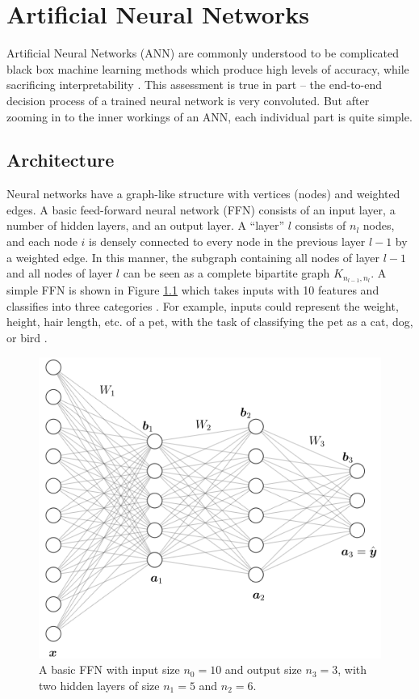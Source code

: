 
\appendix \label{apdx}



\chapter{Artificial Neural Networks} \label{apdx:ann}
Artificial Neural Networks (ANN) are commonly understood to be complicated black box machine learning methods which produce high levels of accuracy, while sacrificing interpretability \cite{pattern_rec_book}. This assessment is true in part -- the end-to-end decision process of a trained neural network is very convoluted. But after zooming in to the inner workings of an ANN, each individual part is quite simple.

\section{Architecture}
Neural networks have a graph-like structure with vertices (nodes) and weighted edges. A basic feed-forward neural network (FFN) consists of an input layer, a number of hidden layers, and an output layer. A ``layer'' $l$ consists of $n_l$ nodes, and each node $i$ is densely connected to every node in the previous layer $l-1$ by a weighted edge. In this manner, the subgraph containing all nodes of layer $l-1$ and all nodes of layer $l$ can be seen as a complete bipartite graph $K_{n_{l-1}, n_l}$. A simple FFN is shown in Figure \ref{fig:ffn_example} which takes inputs with 10 features and classifies into three categories \cite{nn_svg}. For example, inputs could represent the weight, height, hair length, etc. of a pet, with the task of classifying the pet as a cat, dog, or bird \cite{neural_net}.

\begin{figure}[h]
  \centering
  \includegraphics[width=.85\textwidth]{img/ffn_visual.png}
  \caption{A basic FFN with input size $n_0 = 10$ and output size $n_3 = 3$, with two hidden layers of size $n_1 = 5$ and $n_2 = 6$.}
  \label{fig:ffn_example}
\end{figure}

